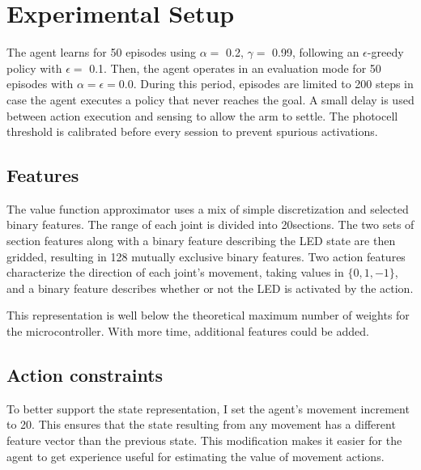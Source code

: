 \documentclass{article}
\begin{document}
	
	
	\section{Experimental Setup}
	

	The agent learns for 50 episodes using $\alpha =$ 0.2, $\gamma =$ 0.99,  following an $\epsilon$-greedy policy with $\epsilon=$ 0.1. Then, the agent operates in an evaluation mode for 50 episodes with $\alpha=\epsilon=0.0$. During this period, episodes are limited to 200 steps in case the agent executes a policy that never reaches the goal. A small delay is used between action execution and sensing to allow the arm to settle. The photocell threshold is calibrated before every session to prevent spurious activations.
	
	\subsection{Features}

	The value function approximator uses a mix of simple discretization and selected binary features. The range of each joint is divided into 20\degree\space sections. The two sets of section features along with a binary feature describing the LED state are then gridded, resulting in 128 mutually exclusive binary features. Two action features characterize the direction of each joint's movement, taking values in $\{0, 1, -1\}$, and a binary feature describes whether or not the LED is activated by the action.
	
	This representation is well below the theoretical maximum number of weights for the microcontroller. With more time, additional features could be added.
	
	\subsection{Action constraints}
	To better support the state representation, I set the agent's movement increment to 20\degree. This ensures that the state resulting from any movement has a different feature vector than the previous state. This modification makes it easier for the agent to get experience useful for estimating the value of movement actions.
	
	
\end{document}
